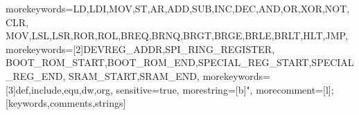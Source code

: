 %
 {morekeywords={LD,LDI,MOV,ST,AR,ADD,SUB,INC,DEC,AND,OR,XOR,NOT,CLR,%
	MOV,LSL,LSR,ROR,ROL,BREQ,BRNQ,BRGT,BRGE,BRLE,BRLT,HLT,JMP},%
morekeywords=[2]{DEVREG_ADDR,SPI_RING_REGISTER,%
	BOOT_ROM_START,BOOT_ROM_END,SPECIAL_REG_START,SPECIAL_REG_END,%
	SRAM_START,SRAM_END},%
morekeywords=[3]{def,include,equ,dw,org},%
   sensitive=true,%
   morestring=[b]",
   morecomment=[l];%
   }[keywords,comments,strings]


